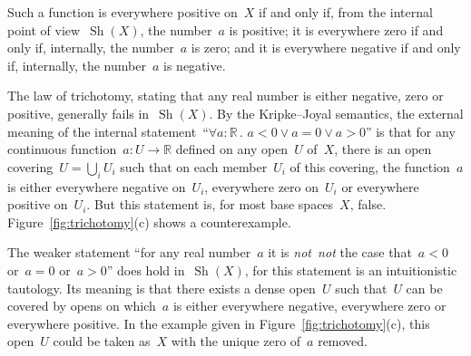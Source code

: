 \documentclass[oneside,reqno]{amsart}
\theoremstyle{definition}
\theoremstyle{plain}
\theoremstyle{remark}
\newcommand{\RR}{\mathbb{R}}
\DeclareMathOperator{\Sh}{Sh}
\renewcommand{\_}{\mathpunct{.}\,}
\newcommand{\?}{\,{:}\,}
\newcommand{\notnot}{\emph{not~not}\xspace}
\begin{document}
Such a function is everywhere positive on~$X$ if and only if, from the internal point of
view~$\Sh(X)$, the number~$a$ is positive; it is everywhere zero if and only
if, internally, the number~$a$ is zero; and it is everywhere negative if and
only if, internally, the number~$a$ is negative.

The law of trichotomy, stating that any real number is either negative, zero or
positive, generally fails in~$\Sh(X)$. By the Kripke--Joyal semantics, the external
meaning of the internal statement~``$\forall a:\RR\_ a<0 \vee a=0 \vee a>0$'' is that for any continuous function~$a : U
\to \RR$ defined on any open~$U$ of~$X$, there is an open covering~$U =
\bigcup_i U_i$ such that on each member~$U_i$ of this covering, the function~$a$ is
either everywhere negative on~$U_i$, everywhere zero on~$U_i$ or everywhere
positive on~$U_i$. But this statement is, for most base spaces~$X$, false.
Figure~\ref{fig:trichotomy}(c) shows a counterexample.

The weaker statement ``for any real number~$a$ it is \notnot the case that~$a < 0$
or~$a = 0$ or~$a > 0$'' does hold in~$\Sh(X)$, for this statement is an
intuitionistic tautology. Its meaning is that there exists a
dense open~$U$ such that~$U$ can be covered by opens on which~$a$ is either
everywhere negative, everywhere zero or everywhere positive. In the example
given in Figure~\ref{fig:trichotomy}(c), this open~$U$ could be taken as~$X$
with the unique zero of~$a$ removed.
\end{document}
